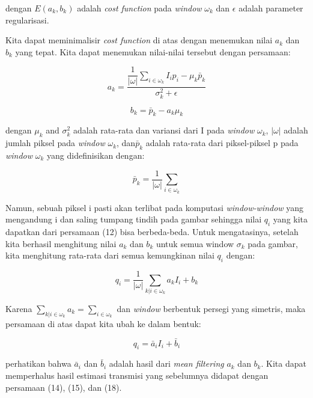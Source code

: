 \documentclass[11pt, a4paper, final]{report}
\begin{document}
dengan $E(a_k, b_k)$ adalah \textit{cost function} pada \textit{window} $\omega_k$ dan $\epsilon$ adalah parameter regularisasi.

Kita dapat meminimalisir \textit{cost function} di atas dengan menemukan nilai $a_k$ dan $b_k$ yang tepat. Kita dapat menemukan nilai-nilai tersebut dengan persamaan:

\begin{equation} \label{eq14}
a_k=\dfrac{\dfrac{1}{|\omega|}\sum_{i\in{\omega_k}}{I_ip_i-\mu_k\bar{p}_k}}{\sigma_k^2+\epsilon}
\end{equation}

\begin{equation} \label{eq15}
b_k=\bar{p}_k-a_k\mu_k
\end{equation}

dengan $\mu_k$ and $\sigma_k^2$ adalah rata-rata dan variansi dari I pada \textit{window} $\omega_k$,  $|\omega|$ adalah jumlah piksel pada \textit{window} $\omega_k$, dan$\bar{p}_k$ adalah rata-rata dari piksel-piksel p pada \textit{window} $\omega_k$ yang didefinisikan dengan:

\begin{equation} \label{eq16}
\bar{p}_k = \dfrac{1}{|\omega|}\sum_{i\in{\omega_k}}
\end{equation}

Namun, sebuah piksel i pasti akan terlibat pada komputasi \textit{window-window} yang mengandung i dan saling tumpang tindih pada gambar sehingga nilai $q_i$ yang kita dapatkan dari persamaan (12) bisa berbeda-beda. Untuk mengatasinya, setelah kita berhasil menghitung nilai $a_k$ dan $b_k$ untuk semua window $\sigma_k$ pada gambar, kita menghitung rata-rata dari semua kemungkinan nilai $q_i$ dengan:

\begin{equation} \label{eq17}
q_i=\dfrac{1}{|\omega|}\sum_{k|i\in{\omega_k}}{a_kI_i+b_k}
\end{equation}

Karena $\sum_{k|i\in{\omega_k}}a_k=\sum_{i\in{\omega_k}}$ dan \textit{window} berbentuk persegi yang simetris, maka persamaan di atas dapat kita ubah ke dalam bentuk:

\begin{equation} \label{eq18}
q_i=\bar{a}_iI_i+\bar{b}_i
\end{equation}

perhatikan bahwa  $\bar{a}_i$ dan $\bar{b}_i$ adalah hasil dari \textit{mean filtering} $a_k$ dan $b_k$. Kita dapat memperhalus hasil estimasi transmisi yang sebelumnya didapat dengan persamaan (14), (15), dan (18).
\end{document}
